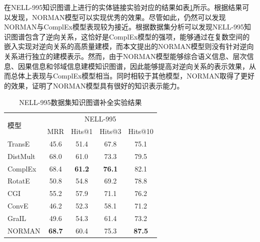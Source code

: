 \documentclass[algorithmlist, AutoFakeBold, AutoFakeSlant, figurelist, tablelist, nomlist, engineering]{seuthesix}
\begin{document}
在NELL-995知识图谱上进行的实体链接实验对应的结果如表\ref{Experiment1_NELL-995}所示。根据结果可以发现，NORMAN模型可以实现优秀的效果。尽管如此，仍然可以发现NORMAN与ComplEx模型表现较为接近。根据数据集分析可以发现NELL-995知识图谱包含了逆向关系，这恰好是ComplEx模型的强项，能够通过在复数空间的嵌入实现对逆向关系的高质量建模，而本文提出的NORMAN模型则没有针对逆向关系进行独立的建模表示。然而，由于NORMAN模型能够综合语义信息、层次信息、因果信息和邻域信息建模知识图谱，因此能够提高对逆向关系的表示效果，从而总体上表现与ComplEx模型相当。同时相较于其他模型，NORMAN取得了更好的效果，证明了NORMAN模型具有很好的知识表示能力。
\begin{table}[]
  \centering
  \begin{tabular*}{0.95\textwidth}{@{\extracolsep{\fill}}lcccc}
  \toprule[1pt]
  \multirow{2}{*}{模型} & \multicolumn{4}{c}{NELL-995} \\
    & MRR & Hits@1 & Hits@3 & Hits@10 \\ \hline
  TransE & 45.6 & 51.4 & 67.8 & 75.1 \\
  DistMult & 68.0 & 61.0 & 73.3 & 79.5 \\
  ComplEx & 68.4 & \textbf{61.2} & \textbf{76.1} & 82.1 \\
  RotatE & 50.8 & 54.8 & 69.2 & 78.8 \\
  CGI & 55.2 & 57.9 & 71.1 & 76.2 \\
  ConvE & 46.2 & 52.3 & 58.1 & 71.2 \\
  GraIL & 49.6 & 54.3 & 61.4 & 73.2 \\
  NORMAN & \textbf{68.7} & 60.4 & 75.3 & \textbf{87.5} \\
  \bottomrule[1pt]
  \end{tabular*}
  \caption{NELL-995数据集知识图谱补全实验结果}
  \label{Experiment1_NELL-995}
\end{table}
\end{document}
